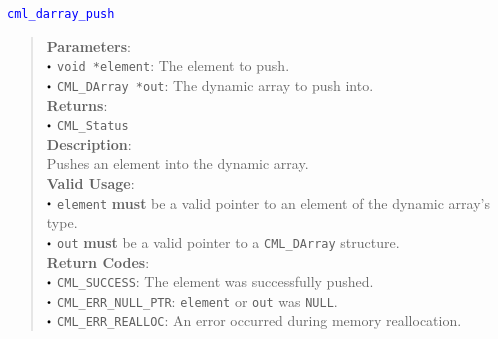\documentclass[a4paper,oneside,8pt]{extarticle}
\newcommand{\function}[1]{
  \noindent\textcolor{blue}{\texttt{#1}}
  \vspace{-0.3em}
}
\renewcommand{\dot}{\raisebox{0.3ex}{\scalebox{0.6}{$\bullet$}}}
\theoremstyle{definition}
\begin{document}
\function{cml\_darray\_push}
\begin{quote}
  \textbf{Parameters}: \\
  $\dot$ \texttt{void *element}: The element to push. \\
  $\dot$ \texttt{CML\_DArray *out}: The dynamic array to push into. \\
  \textbf{Returns}: \\
  $\dot$ \texttt{CML\_Status} \\
  
  \vspace{-0.75em}
  \textbf{Description}: \\
  Pushes an element into the dynamic array. \\

  \vspace{-0.75em}
  \textbf{Valid Usage}: \\
  $\dot$ \texttt{element} \textbf{must} be a valid pointer to an element of the dynamic array's type. \\
  $\dot$ \texttt{out} \textbf{must} be a valid pointer to a \texttt{CML\_DArray} structure. \\

  \vspace{-0.75em}
  \textbf{Return Codes}: \\
  $\dot$ \texttt{CML\_SUCCESS}: The element was successfully pushed. \\
  $\dot$ \texttt{CML\_ERR\_NULL\_PTR}: \texttt{element} or \texttt{out} was \texttt{NULL}. \\
  $\dot$ \texttt{CML\_ERR\_REALLOC}: An error occurred during memory reallocation. \\
\end{quote}
\end{document}

